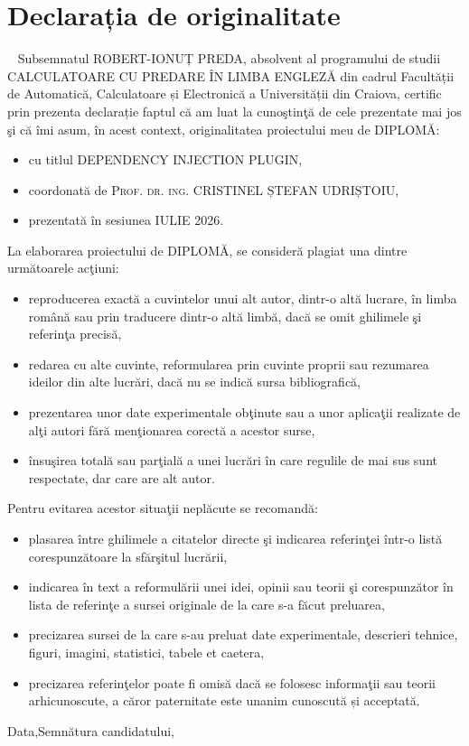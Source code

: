 \chapter*{Declarația de originalitate}
~
Subsemnatul \textsc{ROBERT-IONUȚ PREDA}, absolvent al programului de studii \textsc{CALCULATOARE CU PREDARE ÎN LIMBA ENGLEZĂ} din cadrul Facultății de Automatică, Calculatoare și Electronică a Universității din Craiova, certific prin prezenta declarație faptul că am luat la cunoştinţă de cele prezentate mai jos şi că îmi asum, în acest context, originalitatea proiectului meu de \textsc{DIPLOMĂ}: 
\begin{itemize}
	\item cu titlul \textsc{DEPENDENCY INJECTION PLUGIN}, 
	\item coordonată de \textsc{Prof. dr. ing. CRISTINEL ȘTEFAN UDRIȘTOIU}, 
	\item prezentată în sesiunea \textsc{IULIE 2026}.
\end{itemize}	
	La elaborarea proiectului de \textsc{DIPLOMĂ}, se consideră plagiat una dintre următoarele acţiuni: 
\begin{itemize}	
	\item reproducerea exactă a cuvintelor unui alt autor, dintr-o altă lucrare, în limba română sau prin traducere dintr-o altă limbă, dacă se omit ghilimele şi referinţa precisă, 
	\item redarea cu alte cuvinte, reformularea prin cuvinte proprii sau rezumarea ideilor din alte lucrări, dacă nu se indică sursa bibliografică, 
	\item prezentarea unor date experimentale obţinute sau a unor aplicaţii realizate de alţi autori fără menţionarea corectă a acestor surse, 
	\item însuşirea totală sau parţială a unei lucrări în care regulile de mai sus sunt respectate, dar care are alt autor. 
\end{itemize}
	Pentru evitarea acestor situaţii neplăcute se recomandă: 
\begin{itemize}	
	\item plasarea între ghilimele a citatelor directe şi indicarea referinţei într-o listă corespunzătoare la sfărşitul lucrării, 
	\item indicarea în text a reformulării unei idei, opinii sau teorii şi corespunzător în lista de referinţe a sursei originale de la care s-a făcut preluarea, 
	\item precizarea sursei de la care s-au preluat date experimentale, descrieri tehnice, figuri, imagini, statistici, tabele et caetera, 
	\item precizarea referinţelor poate fi omisă dacă se folosesc informaţii sau teorii arhicunoscute, a căror paternitate este unanim cunoscută și acceptată. 
\end{itemize}

\vspace*{\fill}
Data,\hfill Semnătura candidatului, 
\vspace{\fill}
